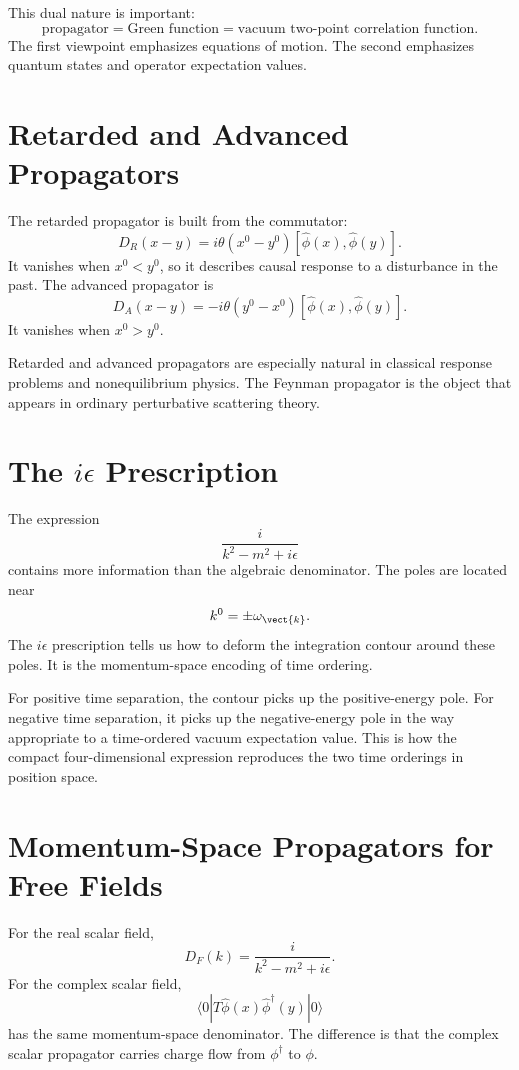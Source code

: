 This dual nature is important:
\[
    \text{propagator}
    = \text{Green function}
    = \text{vacuum two-point correlation function}.
\]
The first viewpoint emphasizes equations of motion. The second emphasizes
quantum states and operator expectation values.

\section{Retarded and Advanced Propagators}

The retarded propagator is built from the commutator:
\[
    D_R(x-y)
    = i\theta(x^0-y^0)[\hat\phi(x),\hat\phi(y)].
\]
It vanishes when \(x^0<y^0\), so it describes causal response to a disturbance
in the past. The advanced propagator is
\[
    D_A(x-y)
    = -i\theta(y^0-x^0)[\hat\phi(x),\hat\phi(y)].
\]
It vanishes when \(x^0>y^0\).

Retarded and advanced propagators are especially natural in classical response
problems and nonequilibrium physics. The Feynman propagator is the object that
appears in ordinary perturbative scattering theory.

\section{The \texorpdfstring{\(i\epsilon\)}{i-epsilon} Prescription}

The expression
\[
    \frac{i}{k^2-m^2+i\epsilon}
\]
contains more information than the algebraic denominator. The poles are located
near
\[
    k^0=\pm\omega_{\vect{k}}.
\]
The \(i\epsilon\) prescription tells us how to deform the integration contour
around these poles. It is the momentum-space encoding of time ordering.

For positive time separation, the contour picks up the positive-energy pole. For
negative time separation, it picks up the negative-energy pole in the way
appropriate to a time-ordered vacuum expectation value. This is how the compact
four-dimensional expression reproduces the two time orderings in position
space.

\section{Momentum-Space Propagators for Free Fields}

For the real scalar field,
\[
    D_F(k)=\frac{i}{k^2-m^2+i\epsilon}.
\]
For the complex scalar field,
\[
    \langle0|T\hat\phi(x)\hat\phi^\dagger(y)|0\rangle
\]
has the same momentum-space denominator. The difference is that the complex
scalar propagator carries charge flow from \(\phi^\dagger\) to \(\phi\).

